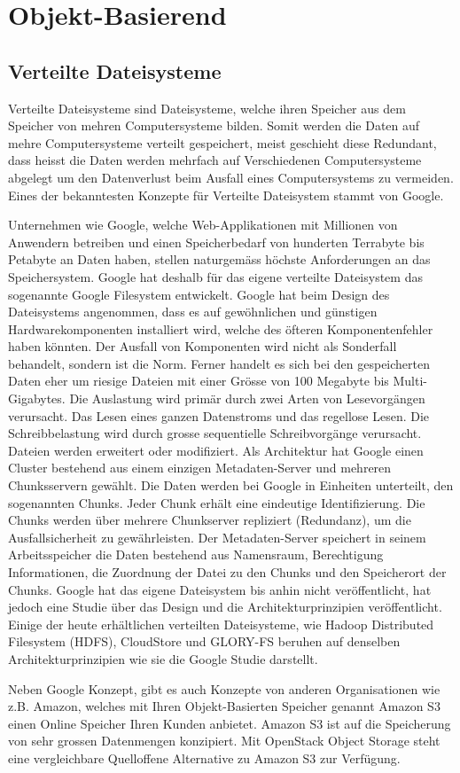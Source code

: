 \section{Objekt-Basierend}

\subsection{Verteilte Dateisysteme}
Verteilte Dateisysteme sind Dateisysteme, welche ihren Speicher aus dem Speicher von mehren Computersysteme bilden. Somit werden die Daten auf mehre Computersysteme verteilt gespeichert, meist geschieht diese Redundant, dass heisst die Daten werden mehrfach auf Verschiedenen Computersysteme abgelegt um den Datenverlust beim Ausfall eines Computersystems zu vermeiden. Eines der bekanntesten Konzepte für Verteilte Dateisystem stammt von Google.

Unternehmen wie Google, welche Web-Applikationen mit Millionen von Anwendern betreiben und einen Speicherbedarf von hunderten Terrabyte bis Petabyte an Daten haben, stellen naturgemäss höchste Anforderungen an das Speichersystem. Google hat deshalb für das eigene verteilte Dateisystem das sogenannte Google Filesystem entwickelt. Google hat beim Design des Dateisystems angenommen, dass es auf gewöhnlichen und günstigen Hardwarekomponenten installiert wird, welche des öfteren Komponentenfehler haben könnten. Der Ausfall von Komponenten wird nicht als Sonderfall behandelt, sondern ist die Norm. Ferner handelt es sich bei den gespeicherten Daten eher um riesige Dateien mit einer Grösse von 100 Megabyte bis Multi-Gigabytes. Die Auslastung wird primär durch zwei Arten von Lesevorgängen verursacht. Das Lesen eines ganzen Datenstroms und das regellose Lesen. Die Schreibbelastung wird durch grosse sequentielle Schreibvorgänge verursacht. Dateien werden erweitert oder modifiziert. Als Architektur hat Google einen Cluster bestehend aus einem einzigen Metadaten-Server und mehreren Chunksservern gewählt. Die Daten werden bei Google in Einheiten unterteilt, den sogenannten Chunks. Jeder Chunk erhält eine eindeutige Identifizierung. Die Chunks werden über mehrere Chunkserver repliziert (Redundanz), um die Ausfallsicherheit zu gewährleisten. Der Metadaten-Server speichert in seinem Arbeitsspeicher die Daten bestehend aus Namensraum, Berechtigung Informationen, die Zuordnung der Datei zu den Chunks und den Speicherort der Chunks. Google hat das eigene Dateisystem bis anhin nicht veröffentlicht, hat jedoch eine Studie über das Design und die Architekturprinzipien veröffentlicht. Einige der heute erhältlichen verteilten Dateisysteme, wie Hadoop Distributed Filesystem (HDFS), CloudStore und GLORY-FS beruhen auf denselben Architekturprinzipien wie sie die Google Studie darstellt. \cite{Ghemawat2003}

Neben Google Konzept, gibt es auch Konzepte von anderen Organisationen wie z.B. Amazon, welches mit Ihren Objekt-Basierten Speicher genannt Amazon S3 einen Online Speicher Ihren Kunden anbietet. Amazon S3 ist auf die Speicherung von sehr grossen Datenmengen konzipiert. Mit OpenStack Object Storage steht eine vergleichbare Quelloffene Alternative zu Amazon S3 zur Verfügung.
